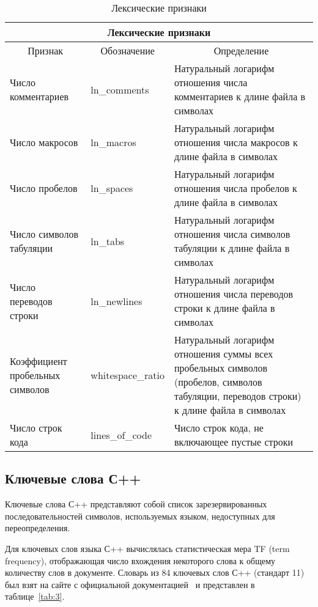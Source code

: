 \begin{table}[h!]
\caption{ Лексические признаки }
\label{tab:1}
\begin{center}
\begin{tabularx}{\linewidth}{|X|X|X|}
\hline
\multicolumn{3}{|c|}{Лексические признаки} \\
\hline
\multicolumn{1}{|c|}{Признак} & \multicolumn{1}{|c|}{Обозначение} & \multicolumn{1}{|c|}{Определение} \\
\hline
Число комментариев & ln\_comments & Натуральный логарифм отношения числа комментариев к длине файла в символах \\
\hline
Число макросов & ln\_macros & Натуральный логарифм отношения числа макросов к длине файла в символах \\
\hline
Число пробелов & ln\_spaces & Натуральный логарифм отношения числа пробелов к длине файла в символах \\
\hline
Число символов табуляции & ln\_tabs & Натуральный логарифм отношения числа символов табуляции к длине файла в символах \\
\hline
Число переводов строки & ln\_newlines & Натуральный логарифм отношения числа переводов строки к длине файла в символах \\
\hline
Коэффициент пробельных символов & whitespace\_ratio & Натуральный логарифм отношения суммы всех пробельных символов (пробелов, символов табуляции, переводов строки) к длине файла в символах \\
\hline
Число строк кода & lines\_of\_code & Число строк кода, не включающее пустые строки\\
\hline
\end{tabularx}
\end{center}
\end{table}



\subsection{Ключевые слова С++}\label{keycpp}

Ключевые слова С++ представляют собой список зарезервированных последовательностей символов, используемых языком, недоступных для переопределения.

Для ключевых слов языка С++ вычислялась статистическая мера TF (term frequency), отображающая число вхождения некоторого слова к общему количеству слов в документе. Словарь из 84 ключевых слов С++ (стандарт 11) был взят на сайте с официальной документацией~\cite{cppkeywords} и представлен в таблице~\ref{tab:3}.


